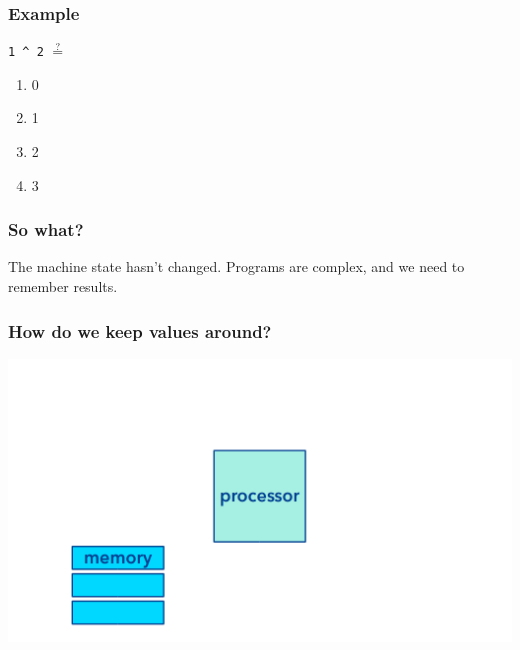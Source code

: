 \documentclass[11pt]{beamer}
\begin{document}
\begin{frame}
  \frametitle{Example}
  \Enlarge

  \texttt{1 \^{} 2} $\overset{?}{=}$
  \\
  \begin{enumerate}[label=\Alph*]
  \item  0
  \item  1
  \item  2
  \item  3
  \end{enumerate}
\end{frame}


\begin{frame}
  \frametitle{So what?}
  \Enlarge

  \begin{itemize}
  \myitem  The machine state hasn't changed. \pause
  \myitem  Programs are complex, and we need to remember results.
  \end{itemize}
\end{frame}

\begin{frame}
  \frametitle{How do we keep values around?}
  \includegraphics[width=\textwidth]{./img/computer-memory.png}
\end{frame}
\end{document}
